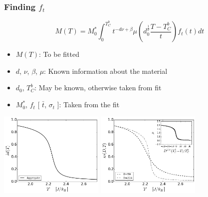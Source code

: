 \documentclass{beamer}
\begin{document}
\begin{frame}
	\frametitle{Finding $f_t$}
	$$
	M(T) = M_0^*\int_0^{T_C^b} t^{-d\nu +\beta} \mu\left(d_0^{\frac{1}{\nu}}\frac{T-T_C^b}{t}\right) f_t(t) dt
	$$
	
	\begin{itemize}
		\item{$M(T)$: To be fitted}
		\item{$d$, $\nu$, $\beta$, $\mu$: Known information about the material}
		\item{$d_0$, $T_C^b$: May be known, otherwise taken from fit}
		\item{$M_0^*$, $f_t$ [ $\bar{t}$, $\sigma_t$ ]: Taken from the fit}
	\end{itemize}
	
	\begin{center}
	\includegraphics[width=5cm]{Images/Aggregate} \hspace{3mm}
	\includegraphics[width=5cm]{Images/Ds}
	
	\end{center}
\end{frame}
\end{document}
